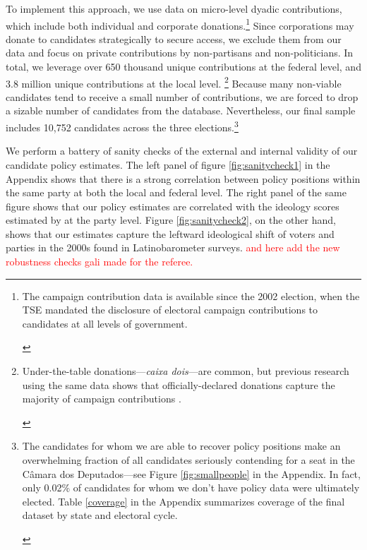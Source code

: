 \documentclass[12pt,english]{article}
\newcommand{\note}[1]{\footnote{ \begin{doublespace}#1  \end{doublespace}}}
\numberwithin{equation}{section}
\theoremstyle{plain}
\theoremstyle{remark}
\theoremstyle{plain}
\newcommand{\red}[1]{\textcolor{red}{#1}}
\begin{document}
To implement this approach, we use data on micro-level dyadic contributions, which include both individual and corporate donations.\note{\normalsize The campaign contribution data is available since the 2002 election, when the TSE mandated the disclosure of electoral campaign contributions to candidates at all levels of government.%
}  Since corporations may donate to candidates strategically to secure access, we exclude them from our data and focus on private contributions by non-partisans and non-politicians. In total, we leverage over 650 thousand unique contributions at the federal level, and 3.8 million unique contributions at the local level.%
\note{\normalsize Under-the-table donations---\emph{caixa dois}---are common, but previous research using the same data shows that officially-declared donations capture the majority of campaign contributions \cite{BoasHidalgoRichardson2014}.} Because many non-viable candidates tend to receive a small number of contributions, we are forced to drop a sizable number of candidates from the database. Nevertheless, our final sample includes %
10,752 candidates across the three elections.\note{\normalsize The candidates for whom we are able to recover policy positions make an overwhelming fraction of all candidates seriously contending for a seat in the  C\^{a}mara dos Deputados---see Figure \ref{fig:smallpeople} in the Appendix. In fact, only 0.02\% of candidates for whom we don't have policy data were ultimately elected. Table \ref{coverage} in the Appendix summarizes coverage of the final dataset by state and electoral cycle.} 
 
We perform a battery of sanity checks of the external and internal validity of our candidate policy estimates.  The left panel of figure \ref{fig:sanitycheck1} in the Appendix shows that there is a strong correlation between policy positions within the same party at both the local and federal level. The right panel of the same figure shows that our policy estimates are correlated with the ideology scores estimated by   at the party level. Figure \ref{fig:sanitycheck2}, on the other hand, shows that our estimates capture the leftward ideological shift of voters and parties in the 2000s found in Latinobarometer surveys. %
\red{and here add the new robustness checks gali made for the referee.}
\end{document}
